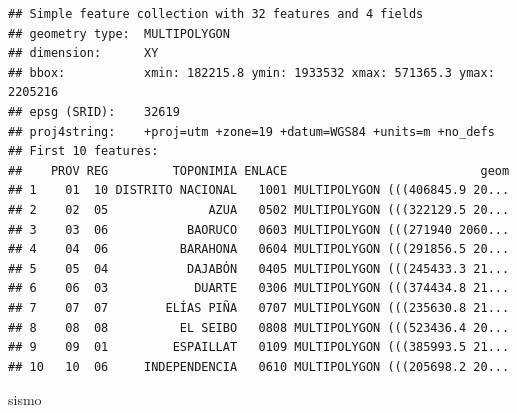 \documentclass[11pt,]{article}
\newenvironment{Shaded}{\begin{snugshade}}{\end{snugshade}}
\newcommand{\NormalTok}[1]{#1}
\begin{document}
\begin{verbatim}
## Simple feature collection with 32 features and 4 fields
## geometry type:  MULTIPOLYGON
## dimension:      XY
## bbox:           xmin: 182215.8 ymin: 1933532 xmax: 571365.3 ymax: 2205216
## epsg (SRID):    32619
## proj4string:    +proj=utm +zone=19 +datum=WGS84 +units=m +no_defs
## First 10 features:
##    PROV REG         TOPONIMIA ENLACE                           geom
## 1    01  10 DISTRITO NACIONAL   1001 MULTIPOLYGON (((406845.9 20...
## 2    02  05              AZUA   0502 MULTIPOLYGON (((322129.5 20...
## 3    03  06           BAORUCO   0603 MULTIPOLYGON (((271940 2060...
## 4    04  06          BARAHONA   0604 MULTIPOLYGON (((291856.5 20...
## 5    05  04           DAJABÓN   0405 MULTIPOLYGON (((245433.3 21...
## 6    06  03            DUARTE   0306 MULTIPOLYGON (((374434.8 21...
## 7    07  07        ELÍAS PIÑA   0707 MULTIPOLYGON (((235630.8 21...
## 8    08  08          EL SEIBO   0808 MULTIPOLYGON (((523436.4 20...
## 9    09  01         ESPAILLAT   0109 MULTIPOLYGON (((385993.5 21...
## 10   10  06     INDEPENDENCIA   0610 MULTIPOLYGON (((205698.2 20...
\end{verbatim}

\begin{Shaded}
\begin{Highlighting}[]
\NormalTok{sismo}
\end{Highlighting}
\end{Shaded}
\end{document}
